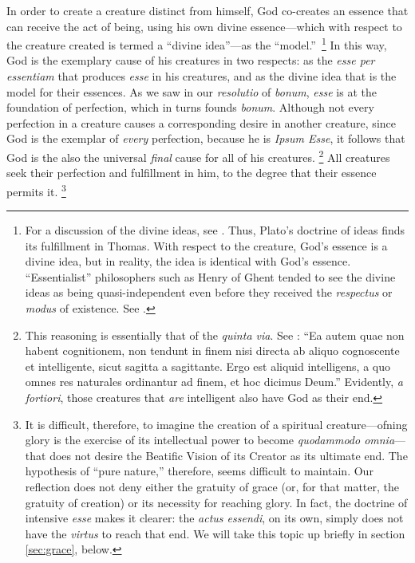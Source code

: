 In order to create a creature distinct from himself, God co-creates an essence that can receive the act of being, using his own divine essence—which with respect to the creature created is termed a “divine idea”—as the “model.”\,%
%
\footnote{For a discussion of the divine ideas, see \cite[I, q.~15]{st:summa}. Thus, Plato’s doctrine of ideas finds its fulfillment in Thomas. With respect to the creature, God’s essence is a divine idea, but in reality, the idea is identical with God’s essence. “Essentialist” philosophers such as Henry of Ghent tended to see the divine ideas as being quasi-independent even before they received the \emph{respectus} or \emph{modus} of existence. See \cite[7]{stanford:henry-of-ghent}.}
%
In this way, God is the exemplary cause of his creatures in two respects: as the \emph{esse per essentiam} that produces \emph{esse} in his creatures, and as the divine idea that is the model for their essences. As we saw in our \emph{resolutio} of \emph{bonum}, \emph{esse} is at the foundation of perfection, which in turns founds \emph{bonum}. Although not every perfection in a creature causes a corresponding desire in another creature, since God is the exemplar of \emph{every} perfection, because he is \emph{Ipsum Esse}, it follows that God is the also the universal \emph{final} cause for all of his creatures.%
%
\footnote{This reasoning is essentially that of the \emph{quinta via}. See \cite[I, q.~2, a.~3, co.]{st:summa}: “Ea autem quae non habent cognitionem, non tendunt in finem nisi directa ab aliquo cognoscente et intelligente, sicut sagitta a sagittante. Ergo est aliquid intelligens, a quo omnes res naturales ordinantur ad finem, et hoc dicimus Deum.” Evidently, \emph{a fortiori}, those creatures that \emph{are} intelligent also have God as their end.}
%
All creatures seek their perfection and fulfillment in him, to the degree that their essence permits it.%
%
\footnote{It is difficult, therefore, to imagine the creation of a spiritual creature—ofning glory is the exercise of its intellectual power to become \emph{quodammodo omnia}—that does not desire the Beatific Vision of its Creator as its ultimate end. The hypothesis of “pure nature,” therefore, seems difficult to maintain. Our reflection does not deny either the gratuity of grace (or, for that matter, the gratuity of creation) or its necessity for reaching glory. In fact, the doctrine of intensive \emph{esse} makes it clearer: the \emph{actus essendi}, on its own, simply does not have the \emph{virtus} to reach that end. We will take this topic up briefly in section \ref{sec:grace}, below.}
